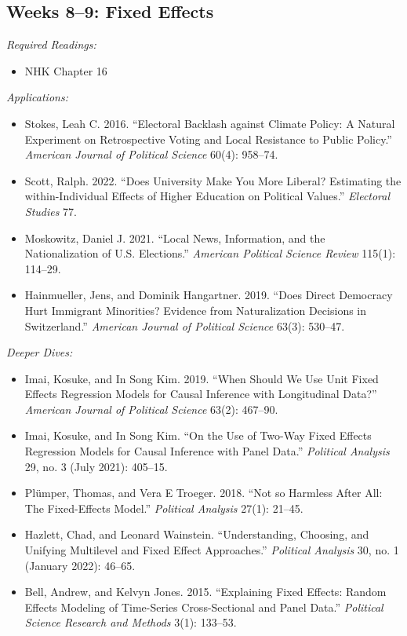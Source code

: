 \documentclass[11pt, letterpaper]{article}
\begin{document}
\subsection*{Weeks 8--9: Fixed Effects}

\textit{Required Readings:}

\begin{itemize}
	\item NHK Chapter 16
\end{itemize}

\noindent \textit{Applications:}

\begin{itemize}
	\item Stokes, Leah C. 2016. ``Electoral Backlash against Climate Policy: A Natural Experiment on Retrospective Voting and Local Resistance to Public Policy.'' \textit{American Journal of Political Science} 60(4): 958–74.
	\item Scott, Ralph. 2022. “Does University Make You More Liberal? Estimating the within-Individual Effects of Higher Education on Political Values.” \textit{Electoral Studies} 77.
	\item Moskowitz, Daniel J. 2021. “Local News, Information, and the Nationalization of U.S. Elections.” \textit{American Political Science Review} 115(1): 114–29.
	\item Hainmueller, Jens, and Dominik Hangartner. 2019. “Does Direct Democracy Hurt Immigrant Minorities? Evidence from Naturalization Decisions in Switzerland.” \textit{American Journal of Political Science} 63(3): 530–47.
\end{itemize}

\noindent \textit{Deeper Dives:}

\begin{itemize}
	\item Imai, Kosuke, and In Song Kim. 2019. ``When Should We Use Unit Fixed Effects Regression Models for Causal Inference with Longitudinal Data?'' \textit{American Journal of Political Science} 63(2): 467–90.
	\item Imai, Kosuke, and In Song Kim. ``On the Use of Two-Way Fixed Effects Regression Models for Causal Inference with Panel Data.'' \textit{Political Analysis} 29, no. 3 (July 2021): 405–15.
	\item Plümper, Thomas, and Vera E Troeger. 2018. “Not so Harmless After All: The Fixed-Effects Model.” \textit{Political Analysis} 27(1): 21–45.
	\item Hazlett, Chad, and Leonard Wainstein. ``Understanding, Choosing, and Unifying Multilevel and Fixed Effect Approaches.'' \textit{Political Analysis} 30, no. 1 (January 2022): 46–65.
	\item Bell, Andrew, and Kelvyn Jones. 2015. “Explaining Fixed Effects: Random Effects Modeling of Time-Series Cross-Sectional and Panel Data.” \textit{Political Science Research and Methods} 3(1): 133–53.
\end{itemize}
\end{document}
